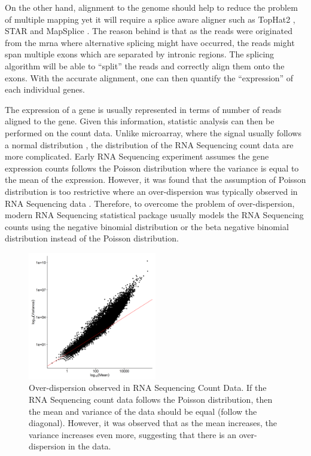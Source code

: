 	On the other hand, alignment to the genome should help to reduce the problem of multiple mapping yet it will require a splice aware aligner such as TopHat2 \citep{Kim2013}, STAR \citep{Dobin2013} and MapSplice \citep{Wang2010}.
	The reason behind is that as the reads were originated from the \gls{mrna} where alternative splicing might have occurred, the reads might span multiple exons which are separated by intronic regions. 
	The splicing algorithm will be able to ``split'' the reads and correctly align them onto the exons. 
	With the accurate alignment, one can then quantify the ``expression'' of each individual genes.
	
	The expression of a gene is usually represented in terms of number of reads aligned to the gene. 
	Given this information, statistic analysis can then be performed on the count data. 
	Unlike microarray, where the signal usually follows a normal distribution \citep{Hoyle2002,Giles2003}, the distribution of the RNA Sequencing count data are more complicated.
	Early RNA Sequencing experiment assumes the gene expression counts follows the Poisson distribution \citep{Marioni2008} where the variance is equal to the mean of the expression.
	However, it was found that the assumption of Poisson distribution is too restrictive where an over-dispersion was typically observed in RNA Sequencing data \citep{Anders2010}.
	Therefore, to overcome the problem of over-dispersion, modern RNA Sequencing statistical package usually models the RNA Sequencing counts using the negative binomial distribution \citep{Anders2010,Robinson2010} or the beta negative binomial distribution \citep{Trapnell2012} instead of the Poisson distribution.
	\begin{figure}
		\centering
		\includegraphics[width=0.5\textwidth]{figure/overdispersion.png}
		\caption[Over-dispersion observed in RNA Sequencing Count Data]{
			Over-dispersion observed in RNA Sequencing Count Data.
			If the RNA Sequencing count data follows the Poisson distribution, then the mean and variance of the data should be equal (follow the diagonal). 
			However, it was observed that as the mean increases, the variance increases even more, suggesting that there is an over-dispersion in the data. 
		}
	\end{figure}
	
